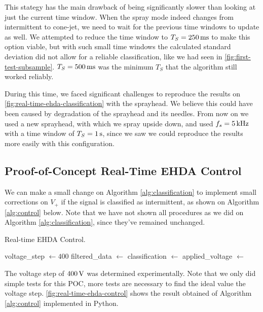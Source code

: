\documentclass[oneside,12pt]{article}
\begin{document}
This stategy has the main drawback of being significantly slower than looking at just the current time window. When the spray 
mode indeed changes from intermittent to cone-jet, we need to wait for the previous time windows to update as well.
We attempted to reduce the time window to $T_S = 250 \,\mathrm{ms}$ to make this option viable, but with such small time
windows the calculated standard deviation did not allow for a reliable classification, 
like we had seen in \autoref{fig:first-test-subsample}. $T_S = 500 \,\mathrm{ms}$ was the minimum $T_S$ that the algorithm still worked
reliably.

During this time, we faced significant challenges to reproduce the results on 
\autoref{fig:real-time-ehda-classification} with the sprayhead. We believe this could have 
been caused by degradation of the sprayhead and its needles. From now on we used
a new sprayhead, with which we spray upside down, and used $f_s = 5 \,\mathrm{kHz}$ with a time
window of $T_S = 1 \,\mathrm{s}$, since we saw we could reproduce the results more easily 
with this configuration.

\subsection{Proof-of-Concept Real-Time EHDA Control}

We can make a small change on Algorithm \ref{alg:classification} to implement small corrections on $V_+$ if the signal 
is classified as intermittent, as shown on Algorithm \ref{alg:control} below. Note that we have not shown all procedures as
we did on Algorithm \ref{alg:classification}, since they've remained unchanged.

\begin{algorithm}[h!]
    \caption{Real-time EHDA Control.}\label{alg:control}
    \begin{algorithmic}[1]
        \State voltage\_step $\gets 400$  
            \State filtered\_data $\gets$ 
            \State classification $\gets$ 
            \State applied\_voltage $\gets$ 

                \State {}
            \EndIf
        \EndWhile
    \end{algorithmic}
\end{algorithm}

The voltage step of $400 \,\mathrm{V}$ was determined experimentally. Note that we only did simple tests for this POC, more 
tests are necessary to find the ideal value the voltage step. \autoref{fig:real-time-ehda-control} shows the result 
obtained of Algorithm \ref{alg:control} implemented in Python.
\end{document}
